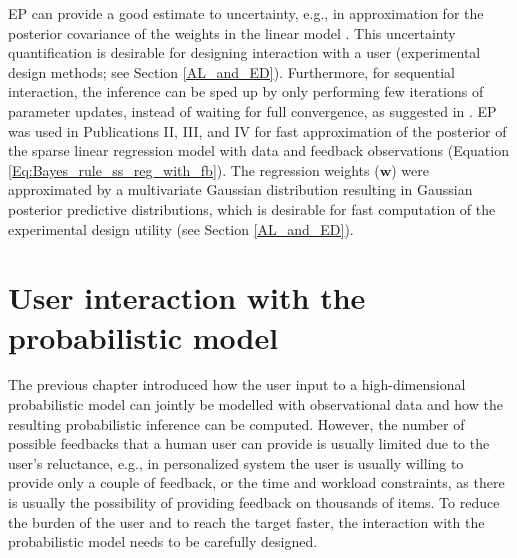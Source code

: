 \documentclass[dissertation,math,vertlayout,pdfa,colorlinks]{aaltoseries}
\newcommand{\bw}{\bm{w}}
\begin{document}
EP can provide a good estimate to uncertainty, e.g., in approximation for the posterior covariance of the weights in the linear model \cite{hernandez2013generalized}. This uncertainty quantification is desirable for designing interaction with a user (experimental design methods; see Section \ref{AL_and_ED}). Furthermore, for sequential interaction, the inference can be sped up by only performing few iterations of parameter updates, instead of waiting for full convergence, as suggested in \cite{seeger2008bayesian}. EP was used in Publications II, III, and IV for fast approximation of the posterior of the sparse linear regression model %
with data and feedback observations (Equation \ref{Eq:Bayes_rule_ss_reg_with_fb}). The regression weights ($\bw$) were approximated by a multivariate Gaussian distribution resulting in Gaussian posterior predictive distributions, which is desirable for fast computation of the experimental design utility (see Section \ref{AL_and_ED}).  
	
	
 










\chapter{User interaction with the probabilistic model}\label{interaction}


 
The previous chapter introduced how the user input to a high-dimensional probabilistic model can jointly be modelled with observational data and how the resulting probabilistic inference can be computed. However, the number of possible feedbacks that a human user can provide is usually limited due to the user's reluctance, e.g., in personalized system the user is usually willing to provide only a couple of feedback, or the time and workload constraints, as there is usually the possibility of providing feedback on thousands of items. To reduce the burden of the user and to reach the target faster, the interaction with the probabilistic model needs to be carefully designed. 
\end{document}
